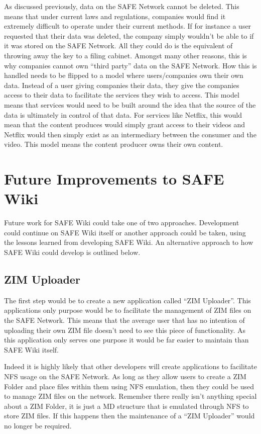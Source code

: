 As discussed previously, data on the SAFE Network cannot be deleted. This means that under current laws and regulations, companies would find it extremely difficult to operate under their current methods. If for instance a user requested that their data was deleted, the company simply wouldn't be able to if it was stored on the SAFE Network. All they could do is the equivalent of throwing away the key to a filing cabinet. Amongst many other reasons, this is why companies cannot own ``third party'' data on the SAFE Network. How this is handled needs to be flipped to a model where users/companies own their own data. Instead of a user giving companies their data, they give the companies access to their data to facilitate the services they wish to access. This model means that services would need to be built around the idea that the source of the data is ultimately in control of that data. For services like Netflix, this would mean that the content produces would simply grant access to their videos and Netflix would then simply exist as an intermediary between the consumer and the video. This model means the content producer owns their own content.

\section{Future Improvements to SAFE Wiki}

Future work for SAFE Wiki could take one of two approaches. Development could continue on SAFE Wiki itself or another approach could be taken, using the lessons learned from developing SAFE Wiki. An alternative approach to how SAFE Wiki could develop is outlined below.

\subsection{ZIM Uploader}

The first step would be to create a new application called ``ZIM Uploader''. This applications only purpose would be to facilitate the management of ZIM files on the SAFE Network. This means that the average user that has no intention of uploading their own ZIM file doesn't need to see this piece of functionality. As this application only serves one purpose it would be far easier to maintain than SAFE Wiki itself.

Indeed it is highly likely that other developers will create applications to facilitate NFS usage on the SAFE Network. As long as they allow users to create a ZIM Folder and place files within them using NFS emulation, then they could be used to manage ZIM files on the network. Remember there really isn't anything special about a ZIM Folder, it is just a MD structure that is emulated through NFS to store ZIM files. If this happens then the maintenance of a ``ZIM Uploader'' would no longer be required.

